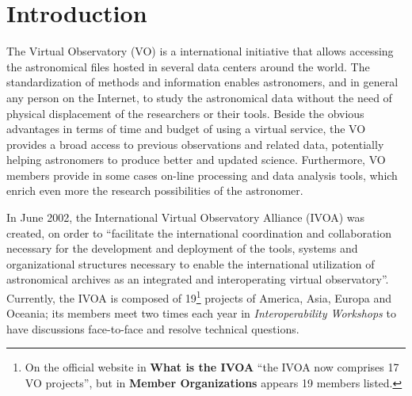 \section{Introduction}
The Virtual Observatory (VO) \cite{Borne2013,HanischQuinn2003} is a
international initiative that allows accessing the astronomical files hosted in
several data centers around the world. The standardization of methods and information 
enables astronomers, and in general any person on the Internet, to study the 
astronomical data without the need of physical displacement of the researchers 
or their tools. Beside the obvious advantages in terms of time and budget of 
using a virtual service, the VO provides a broad access to previous observations
and related data, potentially helping astronomers to produce better and updated
science. Furthermore, VO members provide in some cases on-line processing and
data analysis tools, which enrich even more the research possibilities of
the astronomer.

In June 2002, the International Virtual Observatory Alliance (IVOA)
\cite{website:ivoa-home} was created, on order to ``facilitate the international 
coordination and
collaboration necessary for the development and deployment of the tools, systems
and organizational structures necessary to enable the international utilization
of astronomical archives as an integrated and interoperating virtual
observatory''. Currently, the IVOA is composed of 19\footnote{On the official
website in \textbf{What is the IVOA} ``the IVOA now comprises 17 VO projects'',
but in \textbf{Member Organizations} appears 19 members listed.} projects of
America, Asia, Europa and Oceania; its members meet two times each year in
\emph{Interoperability Workshops} to have discussions face-to-face and resolve
technical questions.








